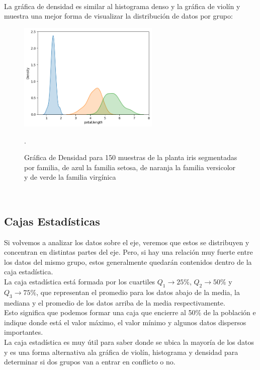 \documentclass{article}
\begin{document}
\clearpage

\hfill\hfill\\
La gráfica de densidad es similar al histograma denso y la gráfica de violín y muestra una mejor forma de visualizar la distribución de datos por grupo:
\begin{figure}[h]
    \centering
    \includegraphics[width=0.6\textwidth]{figures/hist4.png}
    \captionsetup{width=0.8\textwidth}
    \caption{Gráfica de Densidad para 150 muestras de la planta iris segmentadas por familia, de azul la familia setosa, de naranja la familia versicolor y de verde la familia virgínica}.
    \label{fig:hist4}
\end{figure}
\\

\subsection{Cajas Estadísticas}

Si volvemos a analizar los datos sobre el eje, veremos que estos se distribuyen y concentran en distintas partes del eje. Pero, si hay una relación muy fuerte entre los datos del mismo grupo, estos generalmente quedarán contenidos dentro de la caja estadística.
\\[12pt]
La caja estadística está formada por los cuartiles $Q_1 \rightarrow 25\%$, $Q_2 \rightarrow 50\%$ y $Q_3 \rightarrow 75\%$, que representan el promedio para los datos abajo de la media, la mediana y el promedio de los datos arriba de la media respectivamente.
\\[12pt]
Esto significa que podemos formar una caja que encierre al 50\% de la población e indique donde está el valor máximo, el valor mínimo y algunos datos dispersos importantes.
\\[12pt]
La caja estadística es muy útil para saber donde se ubica la mayoría de los datos y es una forma alternativa ala gráfica de violín, histograma y densidad para determinar si dos grupos van a entrar en conflicto o no.
\end{document}
